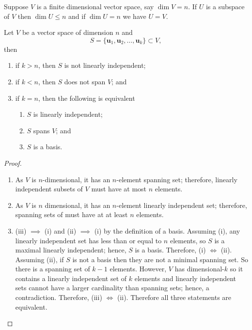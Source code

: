 \begin{theorem}
    Suppose $V$ is a finite dimensional vector space, say $\dim{V}=n$. If $U$ is a subspace of $V$ then $\dim{U} \leq n$ and if $\dim{U}=n$ we have $U = V$.
\end{theorem}


\begin{proposition}
    Let $V$ be a vector space of dimension $n$ and \[S = \{\bm{u}_1, \bm{u}_2, \ldots, \bm{u}_k\} \subset V,\] then
    \begin{enumerate}
        \item if $k > n$, then $S$ is not linearly independent;
        
        \item if $k < n$, then $S$ does not span $V$; and
        
        \item if $k = n$, then the following is equivalent
        \begin{enumerate}
            \item $S$ is linearly independent;
            \item $S$ spans $V$; and
            \item $S$ is a basis.
        \end{enumerate}
    \end{enumerate}
\end{proposition}

\begin{proof}
    \begin{enumerate}
        \item As $V$ is $n$-dimensional, it has an $n$-element spanning set; therefore, linearly independent subsets of $V$ must have at most $n$ elements.
        
        \item As $V$ is $n$ dimensional, it has an $n$-element linearly independent set; therefore, spanning sets of must have at at least $n$ elements.
        
        \item (iii) $\implies$ (i) and (ii) $\implies$ (i) by the definition of a basis. Assuming (i), any linearly independent set has less than or equal to $n$ elements, so $S$ is a maximal linearly independent; hence, $S$ is a basis. Therefore, (i) $\iff$ (ii). Assuming (ii), if $S$ is not a basis then they are not a minimal spanning set. So there is a spanning set of $k - 1$ elements. However, $V$ has dimensional-$k$ so it contains a linearly independent set of $k$ elements and linearly independent sets cannot have a larger cardinality than spanning sets; hence, a contradiction. Therefore, (iii) $\iff$ (ii). Therefore all three statements are equivalent.
    \end{enumerate}
\end{proof}

